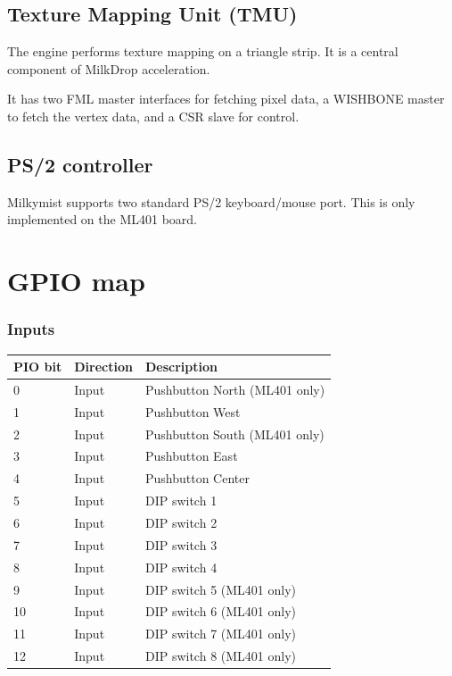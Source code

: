 \documentclass[a4paper,11pt]{article}
\begin{document}
\subsection{Texture Mapping Unit (TMU)}
The engine performs texture mapping on a triangle strip. It is a central component of MilkDrop acceleration.

It has two FML master interfaces for fetching pixel data, a WISHBONE master to fetch the vertex data, and a CSR slave for control.

\subsection{PS/2 controller}
Milkymist supports two standard PS/2 keyboard/mouse port. This is only implemented on the ML401 board.

\section{GPIO map}

\subsubsection{Inputs}

\begin{tabularx}{\textwidth}{|l|l|X|}
\hline
\bf{PIO bit} & \bf{Direction} & \bf{Description} \\
\hline
0 & Input & Pushbutton North (ML401 only) \\
\hline
1 & Input & Pushbutton West \\
\hline
2 & Input & Pushbutton South (ML401 only) \\
\hline
3 & Input & Pushbutton East \\
\hline
4 & Input & Pushbutton Center \\
\hline
5 & Input & DIP switch 1 \\
\hline
6 & Input & DIP switch 2 \\
\hline
7 & Input & DIP switch 3 \\
\hline
8 & Input & DIP switch 4 \\
\hline
9 & Input & DIP switch 5 (ML401 only) \\
\hline
10 & Input & DIP switch 6 (ML401 only) \\
\hline
11 & Input & DIP switch 7 (ML401 only) \\
\hline
12 & Input & DIP switch 8 (ML401 only) \\
\hline
\end{tabularx}
\end{document}
